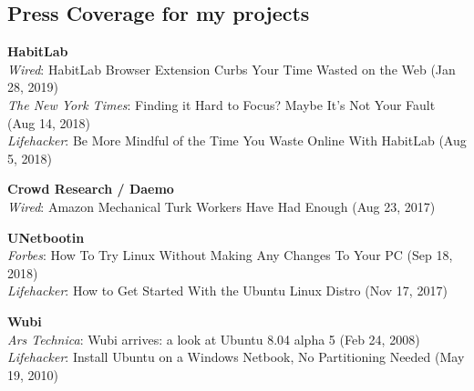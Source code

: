 \documentclass[margin,line]{resume}
\begin{document}
\begin{resume}


\section{\mysidestyle Press Coverage for my projects}

\textbf{HabitLab}\\
\textit{Wired}: HabitLab Browser Extension Curbs Your Time Wasted on the Web (Jan 28, 2019)\\
\textit{The New York Times}: Finding it Hard to Focus? Maybe It's Not Your Fault (Aug 14, 2018)\\
\textit{Lifehacker}: Be More Mindful of the Time You Waste Online With HabitLab (Aug 5, 2018)

\textbf{Crowd Research / Daemo}\\
\textit{Wired}: Amazon Mechanical Turk Workers Have Had Enough (Aug 23, 2017)

\textbf{UNetbootin}\\
\textit{Forbes}: How To Try Linux Without Making Any Changes To Your PC (Sep 18, 2018)\\
\textit{Lifehacker}: How to Get Started With the Ubuntu Linux Distro (Nov 17, 2017)

\textbf{Wubi}\\
\textit{Ars Technica}: Wubi arrives: a look at Ubuntu 8.04 alpha 5 (Feb 24, 2008)\\
\textit{Lifehacker}: Install Ubuntu on a Windows Netbook, No Partitioning Needed (May 19, 2010)


\end{resume}
\end{document}
